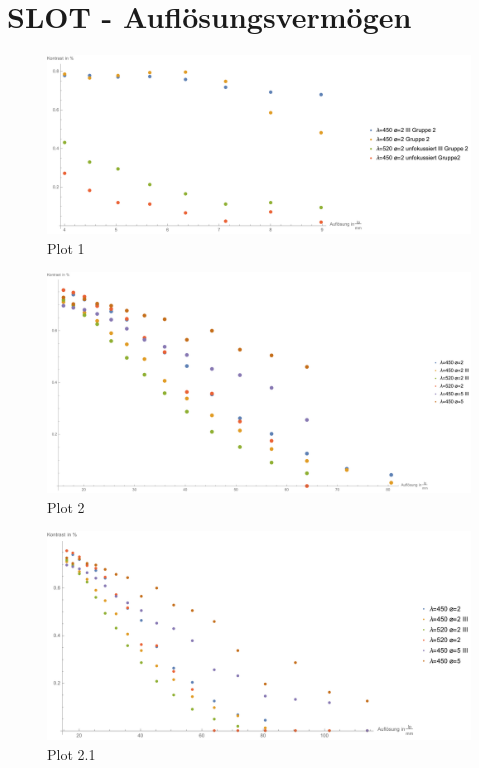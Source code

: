



\section{SLOT - Auflösungsvermögen}

\begin{figure}[H]
	\centering
\includegraphics[width=0.9\linewidth]{IMAGE/Versuch2Plot1.pdf}
	\caption{Plot 1}
	\label{fig:Versuch2_Plot1}
\end{figure} 

\begin{figure}[H]
	\centering
\includegraphics[width=0.9\linewidth]{IMAGE/Versuch2Plot2.pdf}
	\caption{Plot 2}
	\label{fig:Versuch2_Plot2}
\end{figure} 

\begin{figure}[H]
	\centering
\includegraphics[width=0.9\linewidth]{IMAGE/Versuch2Plot2_1.pdf}
	\caption{Plot 2.1}
	\label{fig:Versuch2_Plot2_1}
\end{figure} 


